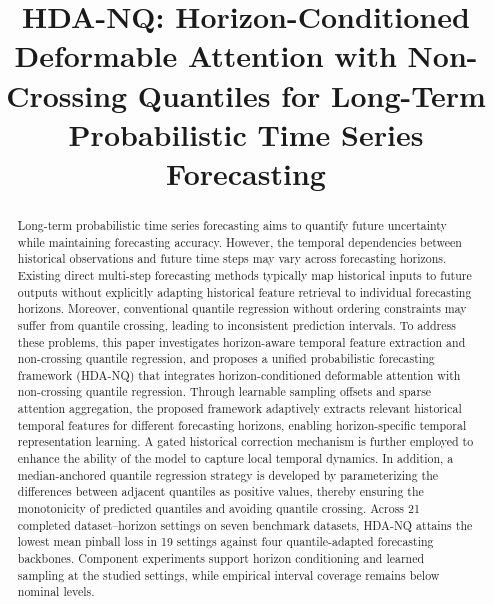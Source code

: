 \documentclass[sigconf,anonymous,review]{acmart}
\begin{document}
\title[HDA-NQ for Probabilistic Time Series Forecasting]
{HDA-NQ: Horizon-Conditioned Deformable Attention with Non-Crossing Quantiles for Long-Term Probabilistic Time Series Forecasting}
\begin{abstract}
Long-term probabilistic time series forecasting aims to quantify future uncertainty while maintaining forecasting accuracy. However, the temporal dependencies between historical observations and future time steps may vary across forecasting horizons. Existing direct multi-step forecasting methods typically map historical inputs to future outputs without explicitly adapting historical feature retrieval to individual forecasting horizons. Moreover, conventional quantile regression without ordering constraints may suffer from quantile crossing, leading to inconsistent prediction intervals. To address these problems, this paper investigates horizon-aware temporal feature extraction and non-crossing quantile regression, and proposes a unified probabilistic forecasting framework (HDA-NQ) that integrates horizon-conditioned deformable attention with non-crossing quantile regression. Through learnable sampling offsets and sparse attention aggregation, the proposed framework adaptively extracts relevant historical temporal features for different forecasting horizons, enabling horizon-specific temporal representation learning. A gated historical correction mechanism is further employed to enhance the ability of the model to capture local temporal dynamics. In addition, a median-anchored quantile regression strategy is developed by parameterizing the differences between adjacent quantiles as positive values, thereby ensuring the monotonicity of predicted quantiles and avoiding quantile crossing. Across 21 completed dataset--horizon settings on seven benchmark datasets, HDA-NQ attains the lowest mean pinball loss in 19 settings against four quantile-adapted forecasting backbones. Component experiments support horizon conditioning and learned sampling at the studied settings, while empirical interval coverage remains below nominal levels.
\end{abstract}
\maketitle
\end{document}
